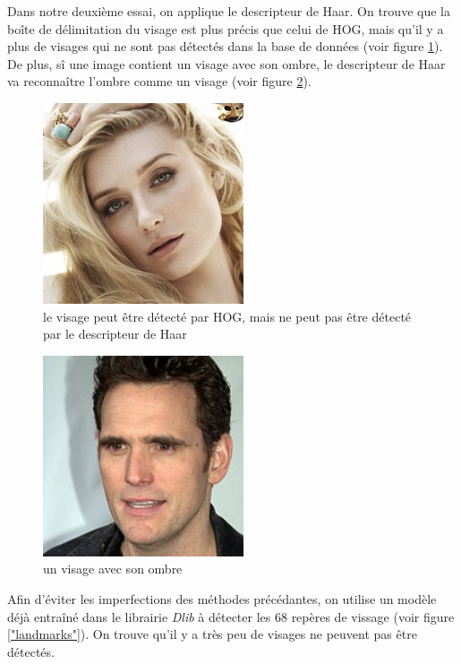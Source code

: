 \documentclass[12pt,french]{report}
\begin{document}
Dans notre deuxième essai, on applique le descripteur de Haar. On trouve que la boîte de délimitation du visage est plus précis que celui de HOG, mais qu'il y a plus de visages qui ne sont pas détectés dans la base de données (voir figure \ref{"haar"}). De plus, sî une image contient un visage avec son ombre, le descripteur de Haar va reconnaître l'ombre comme un visage (voir figure \ref{"ombre"}).
\begin{figure}[H]
    \begin{center}%
		\includegraphics[scale=0.5]{image_rapport/09.jpg}
		\end{center}%
	\caption{le visage peut être détecté par HOG, mais ne peut pas être détecté par le descripteur de Haar }\label{"haar"}%
\end{figure}

\begin{figure}[H]
    \begin{center}%
		\includegraphics[scale=0.5]{image_rapport/05.jpg}
		\end{center}%
	\caption{un visage avec son ombre}\label{"ombre"}%
\end{figure}

Afin d'éviter les imperfections des méthodes précédantes, on utilise un modèle déjà entraîné dans le librairie \emph{Dlib} à détecter les 68 repères de vissage (voir figure \ref{"landmarks"}). On trouve qu'il y a très peu de visages ne peuvent pas être détectés.
\end{document}

